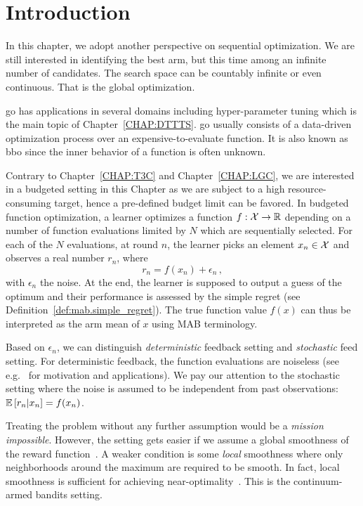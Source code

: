 \section{Introduction}\label{sec:gpo.intro}

In this chapter, we adopt another perspective on sequential optimization. We are still interested in identifying the best arm, but this time among an infinite number of candidates. The search space can be countably infinite or even continuous. That is the global optimization. 

\gls{go} has applications in several domains including hyper-parameter tuning \citep{jamieson2016hyperband, li2017hyperband,samothrakis2013} which is the main topic of Chapter~\ref{CHAP:DTTTS}. \gls{go} usually consists of a data-driven optimization process over an expensive-to-evaluate function. It is also known as \gls{bbo} since the inner behavior of a function is often unknown.

Contrary to Chapter~\ref{CHAP:T3C} and Chapter~\ref{CHAP:LGC}, we are interested in a budgeted setting in this Chapter as we are subject to a high resource-consuming target, hence a pre-defined budget limit can be favored. In budgeted function optimization, a learner optimizes a function $f: \mathcal{X} \rightarrow \mathbb{R}$ depending on a number of function evaluations limited by $N$ which are sequentially selected. For each of the $N$ evaluations, at round $n$, the learner
picks an element $x_n\in\mathcal{X}$ and observes a real number $r_n$, where 
\[
    r_n = f(x_n) + \epsilon_n\,,
\]
with $\epsilon_n$ the noise. At the end, the learner is supposed to output a guess of the optimum and their performance is assessed by the simple regret (see Definition~\ref{def:mab.simple_regret}). The true function value $f(x)$ can thus be interpreted as the arm mean of $x$ using MAB terminology. 

Based on $\epsilon_n$, we can distinguish \emph{deterministic} feedback setting and \emph{stochastic} feed setting. For deterministic feedback, the function evaluations are noiseless (see e.g.~\citealt{defreitas2012gp} for motivation and applications). We pay our attention to the stochastic setting where the noise is assumed to be independent from past observations: $\mathbb{E}\left[r_n|x_n\right] = f(x_n)$.

Treating the problem without any further assumption would be a \emph{mission impossible}. However, the setting gets easier if we assume a global smoothness of the reward function~\citep{agrawal1995continuum,kleinberg2004nearly,kleinberg2008multi,cope2009,auer2007improved,slivkins2011taxonomy,kleinberg2013}. A weaker condition is some \emph{local} smoothness where only neighborhoods around the maximum are required to be smooth.  In fact, local smoothness is sufficient for achieving near-optimality~\citep{valko2013stosoo,azar2014online,grill2015poo,bull2015adaptive}. This is the \gls{continuum-armed bandits} setting.

